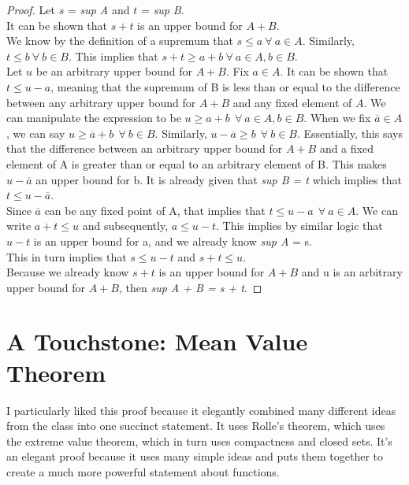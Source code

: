 \documentclass{article}
\begin{document}
\begin{proof}

Let $s$ = \textit{sup A} and $t$ = \textit{sup B}. \\

It can be shown that $s + t$ is an upper bound for $A + B$. \\

We know by the definition of a supremum that $s \leq a \: \forall \:a \in A $. Similarly, $t \leq b \: \forall \:b \in B $. This implies that $s + t \geq a + b \: \forall \: a \in A, b \in B$. \\

Let $u$ be an arbitrary upper bound for $A + B$. Fix $a \in A$. It can be shown that $t \leq u - a$, meaning that the supremum of B is less than or equal to the difference between any arbitrary upper bound for $A + B$ and any fixed element of $A$. We can manipulate the expression to be $u \geq a + b \:\: \forall \: a \in A, b \in B$. When we fix $\overline{a} \in A$, we can say $u \geq \overline{a} + b \:\: \forall \: b \in B$. Similarly, $u - \overline{a} \geq b \:\: \forall \: b \in B$. Essentially, this says that the difference between an arbitrary upper bound for $A + B$ and a fixed element of A is greater than or equal to an arbitrary element of B. This makes $u - \overline{a}$ an upper bound for b. It is already given that \textit{sup B = t} which implies that $t \leq u - \overline{a}$. \\

Since $\overline{a}$ can be any fixed point of A, that implies that $t \leq u - a \:\: \forall \: a \in A$. We can write $a + t \leq u$ and subsequently, $a \leq u - t$. This implies by similar logic that $u -t$ is an upper bound for a, and we already know \textit{sup A} = s. \\

This in turn implies that $s \leq u - t$ and $s + t \leq u$. \\

Because we already know $s + t$ is an upper bound for $A + B$ and u is an arbitrary upper bound for $A + B$, then \textit{sup A + B = s + t}. 

\end{proof}

\section{A Touchstone: Mean Value Theorem}

I particularly liked this proof because it elegantly combined many different ideas from the class into one succinct statement. It uses Rolle's theorem, which uses the extreme value theorem, which in turn uses compactness and closed sets. It's an elegant proof because it uses many simple ideas and puts them together to create a much more powerful statement about functions.\\
\end{document}
